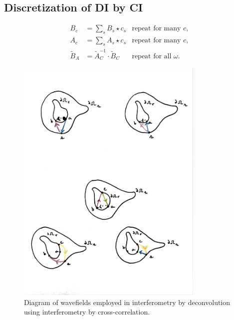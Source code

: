 \documentclass[a4paper,12pt]{article}
\begin{document}
\subsection*{Discretization of DI by CI}
\begin{align}
B_c &= \sum_s B_s \star c_s & \text{repeat for many $c$},\\
A_c &= \sum_s A_s \star c_s & \text{repeat for many $c$},\\
\tilde{B}_A &= \tilde{A}_C^{-1}\cdot \tilde{B}_C & \text{repeat for all $\omega$}.
\end{align}
\begin{figure}[!h]
\centering
\includegraphics[trim={10 90 10 390},clip,width=0.8\textwidth]{../pics/interferometry-diagram.pdf}
\caption{Diagram of wavefields employed in interferometry by deconvolution using interferometry by cross-correlation.}
\end{figure}
%
%


\end{document}
